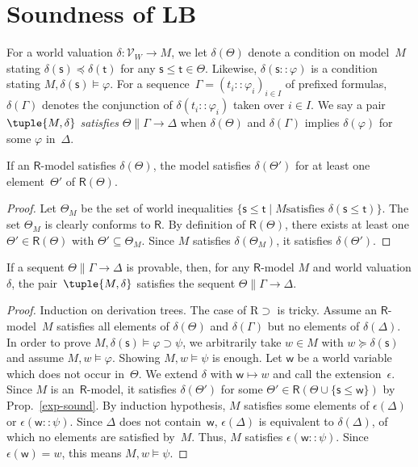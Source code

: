 \documentclass[doctor]{iscs-thesis}
\begin{document}
\section{Soundness of LB}

For a world valuation $\delta:\mathcal V_W\longrightarrow M$,
we let $\delta(\Theta)$ denote a condition on
model~$M$ stating $\delta(\mathsf s)\preceq \delta(\mathsf t)$ for any
$\mathsf s\le \mathsf t\in\Theta$.
Likewise, $\delta(\mathsf s::\varphi)$ is a condition stating
$M,\delta(\mathsf s)\models\varphi$.  For a sequence~$\Gamma =
(t_i::\varphi_i)_{i\in I}$ of
prefixed formulas, $\delta(\Gamma)$ denotes the conjunction
of $\delta(t_i::\varphi_i)$ taken over $i\in I$.
   We say a pair
$\tuple{M,\delta}$ \textit{satisfies}
$\Theta\parallel\Gamma\longrightarrow\Delta$ when $\delta(\Theta)$ and
$\delta(\Gamma)$ implies $\delta(\varphi)$ for some $\varphi$
in~$\Delta$.

\begin{proposition}
 \label{exp-sound}
 If an $\mathsf R$-model satisfies $\delta(\Theta)$,
 the model satisfies $\delta(\Theta')$ for 
 at least one element~$\Theta'$ of $\mathsf R(\Theta)$.
\end{proposition}
\begin{proof}
 Let $\Theta_M$ be the set of world inequalities
 $\{\mathsf s\le \mathsf t\mid M\mbox{
 satisfies }\delta(\mathsf s\le \mathsf t)\}$.
 The set $\Theta_M$ is clearly conforms to $\mathsf R$.
 By definition of $\mathsf R(\Theta)$, there exists at least one $\Theta'\in
 \mathsf R(\Theta)$ with $\Theta'\subseteq \Theta_M$.
 Since $M$ satisfies $\delta(\Theta_M)$, it satisfies $\delta(\Theta')$.
\end{proof}

\begin{lemma}
 \label{sound}
If a sequent $\Theta\parallel \Gamma\longrightarrow \Delta$ is
provable,
then, for any $\mathsf R$-model $M$ and world valuation $\delta$,
the pair~$\tuple{M,\delta}$ satisfies the sequent $\Theta\parallel
 \Gamma\rightarrow\Delta$.
\end{lemma}
\begin{proof}
Induction on derivation trees.
 The case of R$\supset$ is tricky.
 Assume an $\mathsf R$-model~$M$ satisfies all elements of
 $\delta(\Theta)$ and $\delta(\Gamma)$ but no elements of $\delta(\Delta)$.
 In order to prove $M,\delta(\mathsf s)\models\varphi\supset\psi$, we
 arbitrarily take $w\in M$ with $ w\succeq \delta(\mathsf s)$ and assume $M,
  w\models\varphi$.
 Showing $M,w\models\psi$ is enough.
 Let $\mathsf w$ be a world variable which does not occur in~$\Theta$.
 We extend $\delta$ with $\mathsf{w}\mapsto w$ and call the extension~$\epsilon$.
 Since $M$ is an~$\mathsf R$-model,
 it satisfies $\delta(\Theta')$ for some $\Theta'\in \mathsf R(\Theta\cup
 \{\mathsf s\le \mathsf w\})$ by Prop.~\ref{exp-sound}.
 By induction hypothesis, $M$ satisfies some elements of $\epsilon(\Delta)$ or
 $\epsilon(\mathsf w::\psi)$. Since $\Delta$ does not contain~$\mathsf w$,
 $\epsilon(\Delta)$ is equivalent to $\delta(\Delta)$, of which no elements are
 satisfied by~$M$.
 Thus, $M$ satisfies $\epsilon(\mathsf w::\psi)$.
 Since $\epsilon(\mathsf w) = w$, this means $M,  w\models\psi$.
\end{proof}
\end{document}
